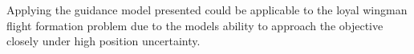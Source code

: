 \documentclass[conference]{IEEEtran}
\begin{document}
Applying the guidance model presented could be applicable to the loyal wingman flight formation problem due to the models ability to approach the objective closely under high position uncertainty. 









\end{document}

